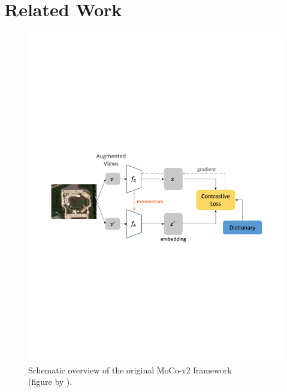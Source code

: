 \section{Related Work}
\label{sec:formatting}

\begin{figure}
\begin{minipage}[t]{0.52\linewidth}
    \centering
    \includegraphics[width=\linewidth]{figures/ap1.pdf}
    \caption{Schematic overview of the original MoCo-v2 framework \\(figure by \cite{geoAwareSelfSuper}).}
    \label{fig:Moco}
\end{minipage}
\hfill
\begin{minipage}[t]{0.44\linewidth}
    \centering

\end{minipage}
\end{figure}
